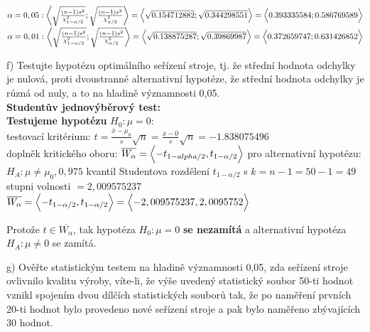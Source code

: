 \documentclass[11pt,a4paper]{article}
\begin{document}
$ \alpha = 0,05 : \biggl< \sqrt{\frac{(n - 1) s^2}{\chi_{1-\alpha/2}^2}} ; \sqrt{\frac{(n - 1) s^2}{\chi_{\alpha/2}^2}} \biggr> = \Bigl< \sqrt{0.154712882} ; \sqrt{0.344298551} \Bigr> = \Bigl< 0.393335584  ; 0.586769589 \Bigr> $ \\

$ \alpha = 0,01 : \biggl< \sqrt{\frac{(n - 1) s^2}{\chi_{1-\alpha/2}^2}} ; \sqrt{\frac{(n - 1) s^2}{\chi_{\alpha/2}^2}} \biggr> = \Bigl< \sqrt{0.138875287} ; \sqrt{0.39869987} \Bigr> = \Bigl< 0.372659747 ; 0.631426852 \Bigr> $ \\

\noindent\makebox[\linewidth]{\rule{\textwidth}{0.4pt}}
\newpage

f) Testujte hypotézu optimálního seřízení stroje, tj. že střední hodnota odchylky je nulová, proti dvoustranné alternativní hypotéze, že střední hodnota odchylky je různá od nuly, a to na hladině významnosti 0,05. \\

\textbf{Studentův jednovýběrový test:} \\

\textbf{Testujeme hypotézu} $ H_0 : \mu = 0: $ \\

testovací kritérium: $ t = \frac{\overline{x} - \mu_0}{s} \sqrt{n} = \frac{\overline{x} - 0}{s} \sqrt{n} = -1.838075496$ \\

doplněk kritického oboru: $ \overline{W_\alpha} = \Bigl< -t_{1-alpha/2} , t_{1-\alpha/2} \Bigr> $ pro alternativní hypotézu: $ H_A : \mu \ne \mu_0, 0,975 $ kvantil Studentova rozdělení $ t_{1-\alpha/2} $ s $ k = n - 1 = 50 - 1 = 49 $ stupni volnosti $ = 2,009575237 $ \\

$ \overline{W_\alpha} = \Bigl< -t_{1-\alpha/2} , t_{1-\alpha/2} \Bigr> = \Bigl< -2,009575237, 2,0095752 \Bigr> $

Protože $ t \in \overline{W_\alpha} $, tak hypotéza $ H_0 : \mu = 0 $ \textbf{se nezamítá} a alternativní hypotéza $ H_A : \mu \ne 0 $ se zamítá.

\noindent\makebox[\linewidth]{\rule{\textwidth}{0.4pt}}


g) Ověřte statistickým testem na hladině významnosti 0,05, zda seřízení stroje ovlivnilo kvalitu výroby,
víte-li, že výše uvedený statistický soubor 50-ti hodnot vznikl spojením dvou dílčích statistických
souborů tak, že po naměření prvních 20-ti hodnot bylo provedeno nové seřízení stroje a pak bylo
naměřeno zbývajících 30 hodnot.
\end{document}
